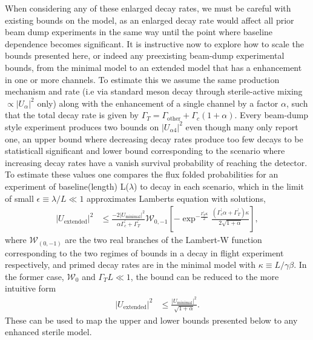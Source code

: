 \documentclass[11pt, a4paper]{article}
\begin{document}
When considering any of these enlarged decay rates, we must be careful with
existing bounds on the model, as an enlarged decay rate would affect all prior
beam dump experiments in the same way until the point where baseline dependence
becomes significant. It is instructive now to explore how to scale the bounds
presented here, or indeed any preexisting beam-dump experimental bounds, from
the minimal model to an extended model that has a enhancement in one or more
channels. To estimate this we assume the same production mechanism and rate
(i.e via standard meson decay through sterile-active mixing $\propto
|U_{\alpha}|^2$ only) along with the enhancement of a single channel by a
factor $\alpha$, such that the total decay rate is given by $\Gamma_T =
\Gamma_\text{other}+\Gamma_c (1+\alpha)$. Every beam-dump style experiment
produces two bounds on $|U_{\alpha 4}|^2$ even though many only report one, an
upper bound where decreasing decay rates produce too few decays to be
statisticall significant and lower bound corresponding to the scenario where
increasing decay rates have a vanish survival probability of reaching the
detector. To estimate these values one compares the flux folded probabilities
for an experiment of baseline(length) L($\lambda$) to decay in each scenario,
which in the limit of small $\epsilon \equiv \lambda/L \ll 1$ approximates
Lamberts equation with solutions, \begin{align*} |U_\text{extended}|^2 &\leq
\frac{-2 |U_\text{minimal}|^2}{\alpha \Gamma^\prime_c +\Gamma^\prime_T}
\mathcal{W}_{0,-1}\left[-\exp^{-\frac{\Gamma^\prime_T \kappa}{2}}
\frac{(\Gamma^\prime_c \alpha + \Gamma^\prime_T)\kappa}{2\sqrt{1+\alpha}}
\right], \end{align*} where $\mathcal{W}_{(0,-1)}$ are the two real branches of
the Lambert-W function corresponding to the two regimes of bounds in a decay in
flight experiment respectively, and primed decay rates are in the minimal model
with $\kappa \equiv L/\gamma \beta$. In the former case, $\mathcal{W}_0$ and
$\Gamma_T L \ll 1$, the bound can be reduced to the more intuitive form
\begin{align*} |U_\text{extended}|^2 &\leq
\frac{|U_{\text{minimal}}|^2}{\sqrt{1+\alpha}}.  \end{align*} These can be used
to map the upper and lower bounds presented below to any enhanced sterile
model.\\
\end{document}
